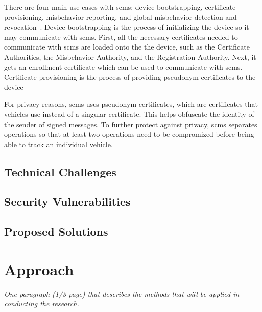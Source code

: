 \documentclass {article}
\newcommand{\sechint}[1]{\small{\emph{#1}} \bigskip}
\begin{document}
There are four main use cases with \gls{scms}: device bootstrapping, certificate provisioning, misbehavior reporting, and global misbehavior detection and revocation~\autocite{brecht_security_2018}. Device bootstrapping is the process of initializing the device so it may communicate with \gls{scms}. First, all the necessary certificates needed to communicate with \gls{scms} are loaded onto the the device, such as the Certificate Authorities, the Misbehavior Authority, and the Registration Authority. Next, it gets an enrollment certificate which can be used to communicate with \gls{scms}. Certificate provisioning is the process of providing pseudonym certificates to the device

For privacy reasons, \gls{scms} uses pseudonym certificates, which are certificates that vehicles use instead of a singular certificate. This helps obfuscate the identity of the sender of signed messages. To further protect against privacy, \gls{scms} separates operations so that at least two operations need to be compromized before being able to track an individual vehicle. 


\subsection{Technical Challenges}

\subsection{Security Vulnerabilities}

\subsection{Proposed Solutions}

\section{Approach}{\sechint{One paragraph (1/3 page) that describes the methods that will be applied in conducting the research.}}
\end{document}

